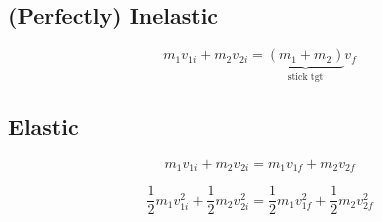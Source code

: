 \documentclass[12pt]{article}
\begin{document}
\begin{spacing}{1.5}
\subsection{(Perfectly) Inelastic}

$$m_1 v_{1i} + m_2 v_{2i} = \underbrace{(m_1 + m_2)}_{\text{stick tgt}} v_f$$

\subsection{Elastic}

$$m_1 v_{1i} + m_2 v_{2i} = m_1 v_{1f} + m_2 v_{2f}$$

$$\frac{1}{2} m_1 v_{1i}^2 + \frac{1}{2} m_2 v_{2i}^2 = \frac{1}{2} m_1 v_{1f}^2 + \frac{1}{2} m_2 v_{2f}^2$$


\end{spacing}
\end{document}
